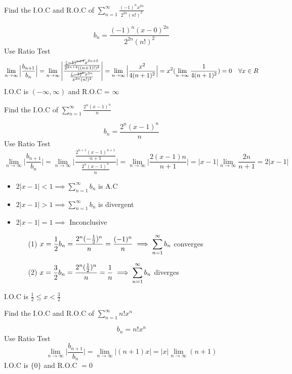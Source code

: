 \begin{eg}
Find the I.O.C and R.O.C of \(\displaystyle \sum^{\infty}_{n = 1} \frac{(-1)^nx^{2n}}{2^{2n}(n!)^2}\)

\soln
\[\displaystyle b_n = \frac{(-1)^n(x - 0)^{2n}}{2^{2n}(n!)^2}\]
Use Ratio Test
\[\displaystyle \lim_{n \to \infty} \Big| \frac{b_{n + 1}}{b_n} \Big| = \lim_{n \to \infty} \Bigg| \frac{\frac{\cancel{(-1)^{n + 1}}x^{2n + 2}}{2^{2n + 2}((n + 1)!)^2}}{\frac{\cancel{(-1)^n}x^{2n}}{x^{2n}(n!)^2}} \Bigg| = \lim_{n \to \infty} \Big| \frac{x^2}{4(n + 1)^2} \Big| = x^2 (\lim_{n \to \infty} \frac{1}{4(n + 1)^2}) = 0 \quad \forall x \in R\]
I.O.C is \((- \infty, \infty)\) and R.O.C = \(\infty\)
\end{eg}
\begin{eg}
Find the I.O.C of \(\displaystyle \sum^{\infty}_{n = 1} \frac{2^n(x - 1)^n}{n}\)

\soln
\[\displaystyle b_n = \frac{2^n(x - 1)^n}{n}\]
Use Ratio Test
\[\displaystyle \lim_{n \to \infty} \Big| \frac{b_{n + 1}}{b_n} \Big| = \lim_{n \to \infty} \Bigg| \frac{\frac{2^{n + 1} (x - 1)^{n +1}}{n + 1}}{\frac{2^n(x - 1)^n}{n}} \Bigg| = \lim_{n \to \infty} \Big| \frac{2(x - 1)n}{n + 1} \Big| = |x - 1| \lim_{n \to \infty} \frac{2n}{n + 1} = 2 |x - 1|\]
\begin{itemize}
\item \(2|x - 1| < 1 \implies \displaystyle \sum^{\infty}_{n = 1} b_n\) is A.C
\item \(2|x - 1| > 1 \implies \displaystyle \sum^{\infty}_{n = 1} b_n\) is divergent 
\item \(2|x - 1| = 1 \implies\) Inconclusive
\begin{itemize}
\item[(1)] \(\displaystyle x = \frac{1}{2} b_n = \frac{2^n(-\frac{1}{2})^n}{n} = \frac{(-1)^n}{n}\\
\implies \displaystyle \sum^{\infty}_{n = 1} b_n\) converges 
\item[(2)] \(\displaystyle x = \frac{3}{2} b_n = \frac{2^n(\frac{1}{2})^n}{n} = \frac{1}{n}\\
\implies \displaystyle \sum^{\infty}_{n = 1} b_n\) diverges
\end{itemize}
\end{itemize}
I.O.C is \(\displaystyle \frac{1}{2} \leq x < \frac{3}{2}\)
\end{eg}
\begin{eg}
Find the I.O.C and R.O.C of \(\displaystyle \sum^{\infty}_{n = 1} n!x^n\)
 
\soln
\[\displaystyle b_n =n!x^n\]
Use Ratio Test
\[\displaystyle \lim_{n \to \infty} \Big| \frac{b_{n + 1}}{b_n} \Big| = \lim_{n \to \infty} \Big| (n + 1)x \Big| = |x| \lim_{n \to \infty} (n + 1)\]
I.O.C is \(\{0\}\) and R.O.C \(= 0\)
\end{eg}
